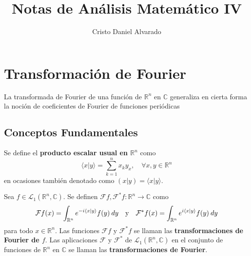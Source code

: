\documentclass[12pt]{report}
\newcounter{it}
\theoremstyle{largebreak}
\newcommand\cf[3]{\ensuremath{#1:#2\rightarrow#3}}
\newcommand\pint[2]{\ensuremath{\langle#1| #2\rangle}}
\begin{document}
    \setlength{\parskip}{5pt} %
    \setlength{\parindent}{12pt} %
    \title{Notas de Análisis Matemático IV}
    \author{Cristo Daniel Alvarado}
    \maketitle

    \tableofcontents %

    
    \setcounter{chapter}{3}

    \chapter{Transformación de Fourier}
    
    La transformada de Fourier de una función de $\mathbb{R}^n$ en $\mathbb{C}$ generaliza en cierta forma la noción de coeficientes de Fourier de funciones periódicas
    
    \section{Conceptos Fundamentales}

    \begin{mydef}
        Se define el \textbf{producto escalar usual en $\mathbb{R}^n$} como
        \begin{equation}
            \label{tf:pint}
            \pint{x}{y}=\sum_{ k=1}^n x_ky_x,\quad\forall x,y\in\mathbb{R}^n
        \end{equation}
        en ocasiones también denotado como $(x|y)=\pint{x}{y}$.
    \end{mydef}

    \begin{mydef}
        Sea $f\in\mathcal{L}_1(\mathbb{R}^n,\mathbb{C})$. Se definen $\cf{\mathcal{F}f,\mathcal{F}^*f}{\mathbb{R}^n}{\mathbb{C}} $ como
        \begin{equation}
            \label{tf:def}
            \mathcal{F}f(x)=\int_{ \mathbb{R}^n}e^{ -i\pint{x}{y}}f(y)\:dy\quad\textup{y}\quad\mathcal{F}^*f(x)=\int_{ \mathbb{R}^n}e^{i\pint{x}{y}}f(y)\:dy
        \end{equation}
        para todo $x\in\mathbb{R}^n$. Las funciones $\mathcal{F}f$ y $\mathcal{F}^*f$ se llaman las \textbf{transformaciones de Fourier de $f$}. Las aplicaciones $\mathcal{F}$ y $\mathcal{F}^*$ de $\mathcal{L}_1(\mathbb{R}^n,\mathbb{C})$ en el conjunto de funciones de $\mathbb{R}^n$ en $\mathbb{C}$ se llaman las \textbf{transformaciones de Fourier}.
    \end{mydef}
\end{document}

